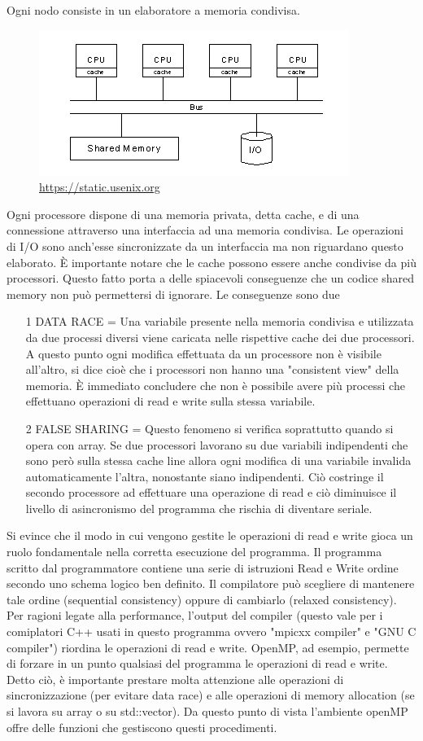 \documentclass[italian]{article}
\begin{document}
Ogni nodo consiste in un elaboratore a memoria condivisa.

\begin{figure}[h!]
\centering
  \includegraphics[width=0.6\linewidth]{SMP.JPG}
  \caption*{\tiny \url{https://static.usenix.org}}
\end{figure}

Ogni processore dispone di una memoria privata, detta cache, e di una connessione attraverso una interfaccia ad una memoria condivisa. Le operazioni di I/O sono anch'esse sincronizzate da un interfaccia ma non riguardano questo elaborato. È importante notare che le cache possono essere anche condivise da più processori. Questo fatto porta a delle spiacevoli conseguenze che un codice shared memory non può permettersi di ignorare. Le conseguenze sono due 
\begin{enumerate}
\item[1] DATA RACE = Una variabile presente nella memoria condivisa e utilizzata da due processi diversi viene caricata nelle rispettive cache dei due processori. A questo punto ogni modifica effettuata da un processore non è visibile all'altro, si dice cioè che i processori non hanno una "consistent view" della memoria. È immediato concludere che non è possibile avere più processi che effettuano operazioni di read e write sulla stessa variabile.
\item[2] FALSE SHARING = Questo fenomeno si verifica soprattutto quando si opera con array. Se due processori lavorano su due variabili indipendenti che sono però sulla stessa cache line allora ogni modifica di una variabile invalida automaticamente l'altra, nonostante siano indipendenti. Ciò costringe il secondo processore ad effettuare una operazione di read e ciò diminuisce il livello di asincronismo del programma che rischia di diventare seriale.
\end{enumerate}
Si evince che il modo in cui vengono gestite le operazioni di read e write gioca un ruolo fondamentale nella corretta esecuzione del programma. Il programma scritto dal programmatore contiene una serie di istruzioni Read e Write ordine secondo uno schema logico ben definito. Il compilatore può scegliere di mantenere tale ordine (sequential consistency) oppure di cambiarlo (relaxed consistency). Per ragioni legate alla performance, l'output del compiler (questo vale per i comiplatori C++ usati in questo programma ovvero "mpicxx compiler" e "GNU C compiler") riordina le operazioni di read e write. OpenMP, ad esempio, permette di forzare in un punto qualsiasi del programma le operazioni di read e write. Detto ciò, è importante prestare molta attenzione alle operazioni di sincronizzazione (per evitare data race) e alle operazioni di memory allocation (se si lavora su array o su std::vector). Da questo punto di vista l'ambiente openMP offre delle funzioni che gestiscono questi procedimenti.
\end{document}
